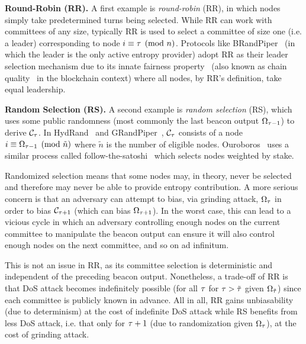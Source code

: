 \noindent\textbf{Round-Robin (RR).} A first example is \textit{round-robin} (RR), in which nodes simply take predetermined turns being selected. While RR can work with committees of any size, typically RR is used to select a committee of size one (i.e. a leader) corresponding to node $i \equiv \tau \pmod n$. Protocols like BRandPiper~\cite{bhat2020randpiper} (in which the \epoch leader is the only active entropy provider) adopt RR as their leader selection mechanism due to its innate fairness property~\cite{azouvi2018winning} (also known as chain quality~\cite{garay2015bitcoin} in the blockchain context) where all nodes, by RR's definition, take equal leadership.

\noindent\textbf{Random Selection (RS).} A second example is \textit{random selection} (RS), which uses some public randomness (most commonly the last beacon output $\Omega_{\tau - 1}$) to derive $\mathcal{C}_\tau$.
In HydRand~\cite{schindler2020hydrand} and GRandPiper~\cite{bhat2020randpiper}, $\mathcal{C}_\tau$ consists of a node $i \equiv \Omega_{\tau - 1} \pmod{\tilde{n}}$ where $\tilde{n}$ is the number of eligible nodes. Ouroboros~\cite{kiayias2017ouroboros} uses a similar process called follow-the-satoshi~\cite{bentov2014proof,kiayias2017ouroboros} which selects nodes weighted by stake.

Randomized selection means that some nodes may, in theory, never be selected and therefore may never be able to provide entropy contribution. A more serious concern is that an adversary can attempt to bias, via grinding attack, $\Omega_\tau$ in order to bias $\mathcal{C}_{\tau + 1}$ (which can bias $\Omega_{\tau + 1}$). In the worst case, this can lead to a vicious cycle in which an adversary controlling enough nodes on the current committee to manipulate the beacon output can ensure it will also control enough nodes on the next committee, and so on ad infinitum.

This is not an issue in RR, as its committee selection is deterministic and independent of the preceding beacon output. Nonetheless, a trade-off of RR is that DoS attack becomes indefinitely possible (for all \epochs $\tau$ for $\tau > \tilde{\tau}$ given $\Omega_{\tilde{\tau}}$) since each committee is publicly known in advance. All in all, RR gains unbiasability (due to determinism) at the cost of indefinite DoS attack while RS benefits from less DoS attack, i.e. that only for \epoch $\tau + 1$ (due to randomization given $\Omega_\tau$), at the cost of grinding attack.

